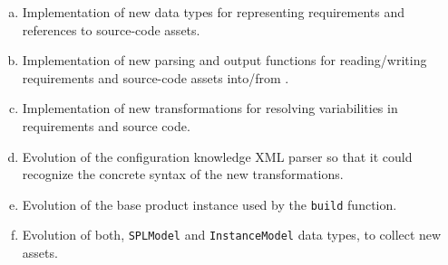 \begin{enumerate}[(a)]

\item Implementation of new data types for representing requirements
  and references to source-code assets.

\item Implementation of new parsing and output functions for
  reading/writing requirements and source-code assets into/from \hp.

\item Implementation of new transformations for resolving
  variabilities in requirements and source code.

\item Evolution of the configuration knowledge XML parser so that it
  could recognize the concrete syntax of the new transformations.

\item Evolution of the base product instance used by the \texttt{build}
  function.

\item Evolution of both, \texttt{SPLModel} and \texttt{InstanceModel}
  data types, to collect new assets.

\end{enumerate}


